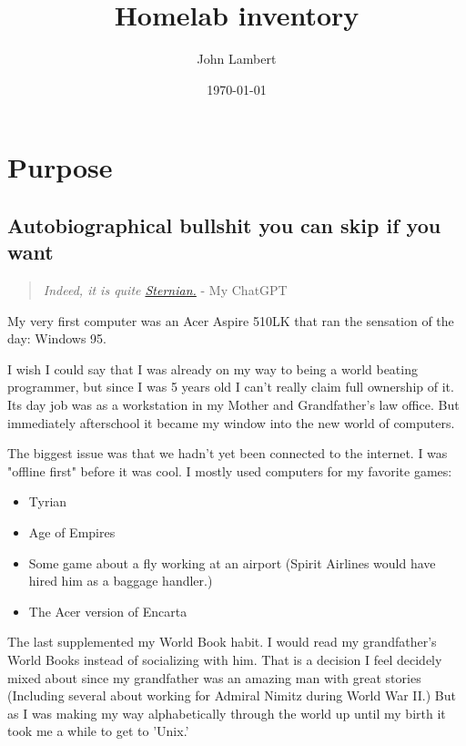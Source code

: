 \documentclass[11pt]{article}
\author{John Lambert}
\date{\today}
\title{Homelab inventory}
\begin{document}
\maketitle
\tableofcontents

\section{Purpose}
\label{sec:org13ea528}
\subsection{Autobiographical bullshit you can skip if you want}
\label{sec:org6dcb9cd}

\begin{quote}
\emph{Indeed, it is quite \href{https://en.wikipedia.org/wiki/The\_Life\_and\_Opinions\_of\_Tristram\_Shandy,\_Gentleman}{Sternian.}} - My ChatGPT
\end{quote}

My very first computer was an Acer Aspire 510LK that ran the sensation of the day: Windows 95.

I wish I could say that I was already on my way to being a world beating programmer, but since I was 5 years old I can't really claim full ownership of it. Its day job was as a workstation in my Mother and Grandfather's law office. But immediately afterschool it became my window into the new world of computers.

The biggest issue was that we hadn't yet been connected to the internet. I was "offline first" before it was cool. I mostly used computers for my favorite games:
\begin{itemize}
\item Tyrian
\item Age of Empires
\item Some game about a fly working at an airport (Spirit Airlines would have hired him as a baggage handler.)
\item The Acer version of Encarta
\end{itemize}

The last supplemented my World Book habit. I would read my grandfather's World Books instead of socializing with him. That is a decision I feel decidely mixed about since my grandfather was an amazing man with great stories (Including several about working for Admiral Nimitz during World War II.) But as I was making my way alphabetically through the world up until my birth it took me a while to get to 'Unix.'
\end{document}
